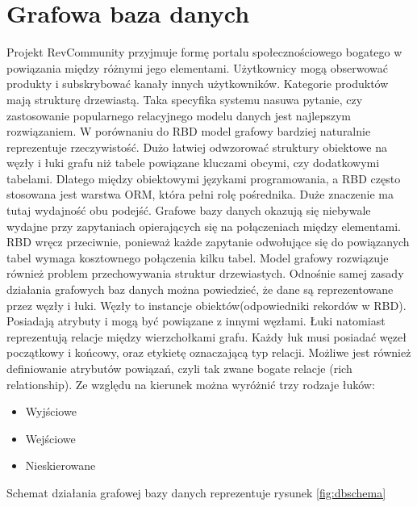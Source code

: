 \section{Grafowa baza danych}

Projekt RevCommunity przyjmuje formę portalu społecznościowego bogatego w powiązania między różnymi jego elementami. Użytkownicy mogą obserwować produkty i subskrybować kanały innych użytkowników. Kategorie produktów mają strukturę drzewiastą. Taka specyfika systemu nasuwa pytanie, czy zastosowanie popularnego relacyjnego modelu danych jest najlepszym rozwiązaniem. W porównaniu do RBD model grafowy bardziej naturalnie reprezentuje rzeczywistość. Dużo łatwiej odwzorować struktury obiektowe na węzły i łuki grafu niż tabele powiązane kluczami obcymi, czy dodatkowymi tabelami. Dlatego między obiektowymi językami programowania, a RBD często stosowana jest warstwa ORM, która pełni rolę pośrednika. Duże znaczenie ma tutaj wydajność obu podejść. Grafowe bazy danych okazują się niebywale wydajne przy zapytaniach opierających się na połączeniach między elementami. RBD wręcz przeciwnie, ponieważ każde zapytanie odwołujące się do powiązanych tabel wymaga kosztownego połączenia kilku tabel. Model grafowy rozwiązuje również problem przechowywania struktur drzewiastych.
Odnośnie samej zasady działania grafowych baz danych można powiedzieć, że dane są reprezentowane przez węzły i łuki. Węzły to instancje obiektów(odpowiedniki rekordów w RBD). Posiadają atrybuty i mogą być powiązane z innymi węzłami. Łuki natomiast reprezentują relacje między wierzchołkami grafu. Każdy łuk musi posiadać węzeł początkowy i końcowy, oraz etykietę oznaczającą typ relacji. Możliwe jest również definiowanie atrybutów powiązań, czyli tak zwane bogate relacje (rich relationship). Ze względu na kierunek można wyróżnić trzy rodzaje łuków:

\begin{itemize}
\item Wyjściowe
\item Wejściowe
\item Nieskierowane
\end{itemize}

\noindent
Schemat działania grafowej bazy danych reprezentuje rysunek \ref{fig:dbschema}


